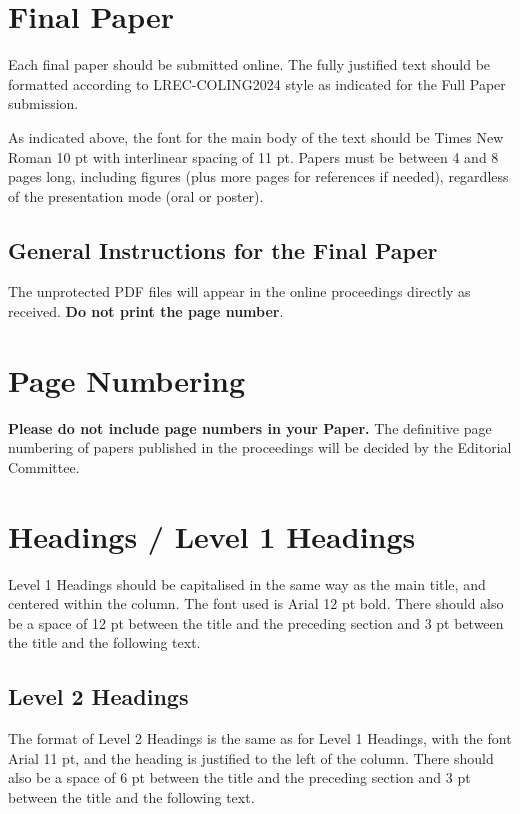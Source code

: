 \documentclass[10pt, a4paper]{article}
\begin{document}
\section{Final Paper}

Each final paper should be submitted online. The fully justified text should be formatted according to LREC-COLING2024 style as indicated for the Full Paper submission.

As indicated above, the font for the main body of the text should be Times  New Roman 10 pt with interlinear spacing of 11 pt. Papers must be between 4 and 8 pages long, including figures (plus more pages for references if needed), regardless of the presentation mode (oral or poster).

\subsection{General Instructions for the Final Paper}

The unprotected PDF files will appear in the online proceedings directly as received. \textbf{Do not print the page number}.

\section{Page Numbering}

\textbf{Please do not include page numbers in your Paper.} The definitive page numbering of papers published in the proceedings will be decided by the Editorial Committee.

\section{Headings / Level 1 Headings} 

Level 1 Headings should be capitalised in the same way as the main title, and centered within the column. The font used is Arial 12 pt bold. There should also be a space of 12 pt between the title and the preceding section and 3 pt between the title and the following text.

\subsection{Level 2 Headings}

The format of Level 2 Headings is the same as for Level 1 Headings, with the font Arial 11 pt, and the heading is justified to the left of the column. There should also be a space of 6 pt between the title and the preceding section and 3 pt between the title and the following text.
\end{document}
